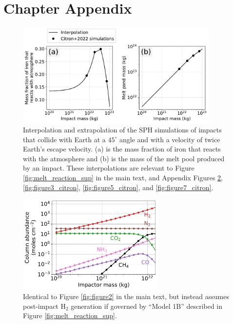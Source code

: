 \section{Chapter Appendix} \label{sec:impacts_appendix}

\begin{figure}
  \centering
  \includegraphics[width=0.9\textwidth]{tex/5impacts/figures/supplement/citron_interpolations.pdf}
  \caption{Interpolation and extrapolation of the \citet{Citron_2022} SPH simulations of impacts that collide with Earth at a $45^\circ$ angle and with a velocity of twice Earth's escape velocity. (a) is the mass fraction of iron that reacts with the atmosphere and (b) is the mass of the melt pool produced by an impact.  These interpolations are relevant to Figure \ref{fig:melt_reaction_sup} in the main text, and Appendix Figures \ref{fig:figure2_citron}, \ref{fig:figure3_citron}, \ref{fig:figure5_citron}, and \ref{fig:figure7_citron}.}
  \label{fig:citron_interpolations}
\end{figure}

\begin{figure}
  \centering
  \includegraphics[width=0.65\textwidth]{tex/5impacts/figures/supplement/Figure2_Citron.pdf}
  \caption{Identical to Figure \ref{fig:figure2} in the main text, but instead assumes post-impact H$_2$ generation if governed by ``Model 1B'' described in Figure \ref{fig:melt_reaction_sup}.}
  \label{fig:figure2_citron}
\end{figure}

